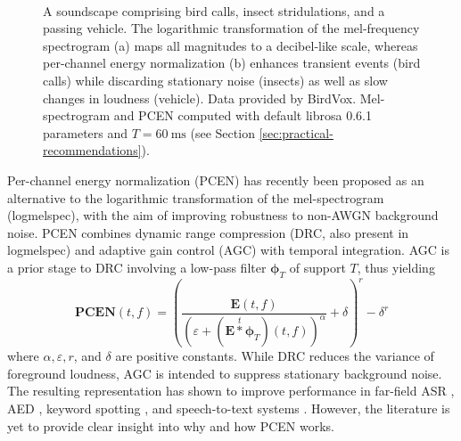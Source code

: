 \documentclass[journal]{IEEEtran}
\theoremstyle{remark}
\begin{document}
\begin{figure}
\centering
{}\\
\caption{A soundscape comprising bird calls, insect stridulations, and a passing vehicle.
The logarithmic transformation of the mel-frequency spectrogram (a) maps all magnitudes to a decibel-like scale, whereas per-channel energy normalization (b) enhances transient events (bird calls) while discarding stationary noise (insects) as well as slow changes in loudness (vehicle). Data provided by BirdVox. Mel-spectrogram and PCEN computed with default librosa 0.6.1 parameters and $T=\SI{60}{\milli\second}$ (see Section \ref{sec:practical-recommendations}).}
\label{fig:spectrogram}
\end{figure} 

Per-channel energy normalization (PCEN) \cite{wang2017icassp} has recently been proposed as an alternative to the logarithmic transformation of the mel-spectrogram (logmelspec), with the aim of improving robustness to non-AWGN background noise.
PCEN combines dynamic range compression (DRC, also present in logmelspec) and adaptive gain control (AGC) with temporal integration. AGC is a prior stage to DRC involving a low-pass filter $\mathbf{\phi}_T$ of support $T$, thus yielding
\begin{equation}
\mathbf{PCEN}(t,f) =
\left(\dfrac{\mathbf{E}(t,f)}{(\varepsilon+(\mathbf{E}\overset{t}{\ast}\boldsymbol{\phi}_T)(t,f))^\alpha} + \delta\right)^r - \delta^r
\end{equation}
where $\alpha, \varepsilon, r$, and $\delta$ are positive constants.
While DRC reduces the variance of foreground loudness, AGC is intended to suppress stationary background noise.
The resulting representation has shown to improve performance in far-field ASR \cite{battenberg2017arxiv}, AED \cite{krstulovic2018casse}, keyword spotting \cite{wang2017icassp}, and speech-to-text systems \cite{shan2018attention}. However, the literature is yet to provide clear insight into why and how PCEN works.
\end{document}
